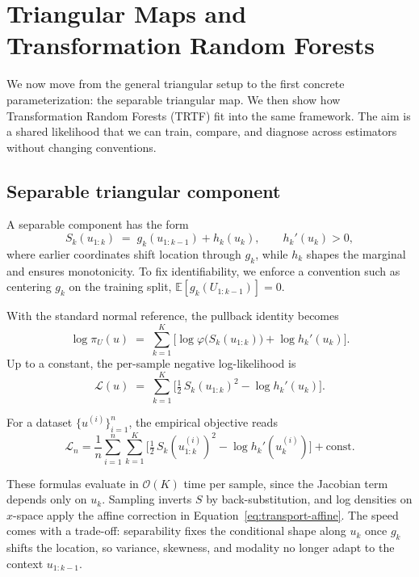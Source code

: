 \documentclass[11pt,a4paper,twoside]{book}\usepackage[]{graphicx}\usepackage[]{xcolor}
\begin{document}
\section{Triangular Maps and Transformation Random Forests}\label{sec:transport-separable}

We now move from the general triangular setup to the first concrete parameterization: the separable triangular map. We then show how Transformation Random Forests (TRTF) fit into the same framework. The aim is a shared likelihood that we can train, compare, and diagnose across estimators without changing conventions.

\subsection{Separable triangular component}

A separable component has the form
\begin{equation}
  S_k(u_{1:k}) \;=\; g_k(u_{1:k-1}) + h_k(u_k), \qquad h_k'(u_k) > 0,
  \label{eq:transport-separable}
\end{equation}
where earlier coordinates shift location through $g_k$, while $h_k$ shapes the marginal and ensures monotonicity. To fix identifiability, we enforce a convention such as centering $g_k$ on the training split, $\mathbb E[g_k(U_{1:k-1})]=0$.

With the standard normal reference, the pullback identity becomes
\begin{equation}
  \log \pi_U(u) \;=\; \sum_{k=1}^{K}\Big[\log \varphi\!\big(S_k(u_{1:k})\big) + \log h_k'(u_k)\Big].
  \label{eq:transport-likelihood}
\end{equation}
Up to a constant, the per-sample negative log-likelihood is
\begin{equation}
  \mathcal{L}(u) \;=\; \sum_{k=1}^{K}\Big[\tfrac{1}{2}\,S_k(u_{1:k})^2 - \log h_k'(u_k)\Big].
  \label{eq:transport-loss}
\end{equation}

For a dataset $\{u^{(i)}\}_{i=1}^n$, the empirical objective reads
\[
\mathcal L_n = \frac{1}{n}\sum_{i=1}^n \sum_{k=1}^{K}
\Big[\tfrac{1}{2}\,S_k(u^{(i)}_{1:k})^2 - \log h_k'(u^{(i)}_k)\Big] + \text{const}.
\]

These formulas evaluate in $\mathcal{O}(K)$ time per sample, since the Jacobian term depends only on $u_k$. Sampling inverts $S$ by back-substitution, and log densities on $x$-space apply the affine correction in Equation~\eqref{eq:transport-affine}. The speed comes with a trade-off: separability fixes the conditional shape along $u_k$ once $g_k$ shifts the location, so variance, skewness, and modality no longer adapt to the context $u_{1:k-1}$.
\end{document}

